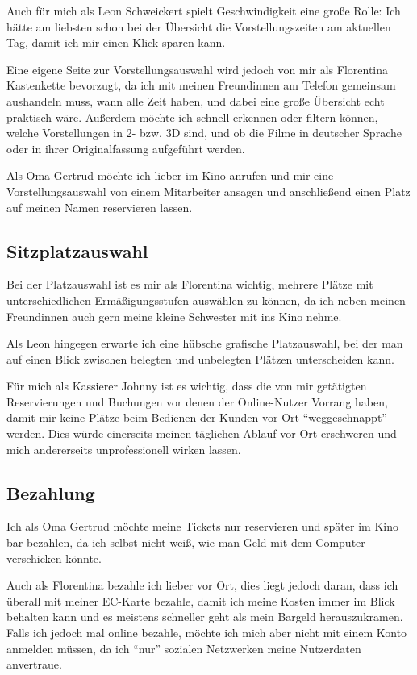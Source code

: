 Auch für mich als Leon Schweickert spielt Geschwindigkeit eine große Rolle: Ich hätte am liebsten schon bei der Übersicht die Vorstellungszeiten am aktuellen Tag, damit ich mir einen Klick sparen kann.

Eine eigene Seite zur Vorstellungsauswahl wird jedoch von mir als Florentina Kastenkette bevorzugt, da ich mit meinen Freundinnen am Telefon gemeinsam aushandeln muss, wann alle Zeit haben, und dabei eine große Übersicht echt praktisch wäre.
Außerdem möchte ich schnell erkennen oder filtern können, welche Vorstellungen in 2- bzw. 3D sind, und ob die Filme in deutscher Sprache oder in ihrer Originalfassung aufgeführt werden.

Als Oma Gertrud möchte ich lieber im Kino anrufen und mir eine Vorstellungsauswahl von einem Mitarbeiter ansagen und anschließend einen Platz auf meinen Namen reservieren lassen.

\subsection{Sitzplatzauswahl}
Bei der Platzauswahl ist es mir als Florentina wichtig, mehrere Plätze mit unterschiedlichen Ermäßigungsstufen auswählen zu können, da ich neben meinen Freundinnen auch gern meine kleine Schwester mit ins Kino nehme.

Als Leon hingegen erwarte ich eine hübsche grafische Platzauswahl, bei der man auf einen Blick zwischen belegten und unbelegten Plätzen unterscheiden kann.

Für mich als Kassierer Johnny ist es wichtig, dass die von mir getätigten Reservierungen und Buchungen vor denen der Online-Nutzer Vorrang haben, damit mir keine Plätze beim Bedienen der Kunden vor Ort \enquote{weggeschnappt} werden.
Dies würde einerseits meinen täglichen Ablauf vor Ort erschweren und mich andererseits unprofessionell wirken lassen.

\subsection{Bezahlung}
Ich als Oma Gertrud möchte meine Tickets nur reservieren und später im Kino bar bezahlen, da ich selbst nicht weiß, wie man Geld mit dem Computer verschicken könnte.

Auch als Florentina bezahle ich lieber vor Ort, dies liegt jedoch daran, dass ich überall mit meiner EC-Karte bezahle, damit ich meine Kosten immer im Blick behalten kann und es meistens schneller geht als mein Bargeld herauszukramen.
Falls ich jedoch mal online bezahle, möchte ich mich aber nicht mit einem Konto anmelden müssen, da ich \enquote{nur} sozialen Netzwerken meine Nutzerdaten anvertraue.


